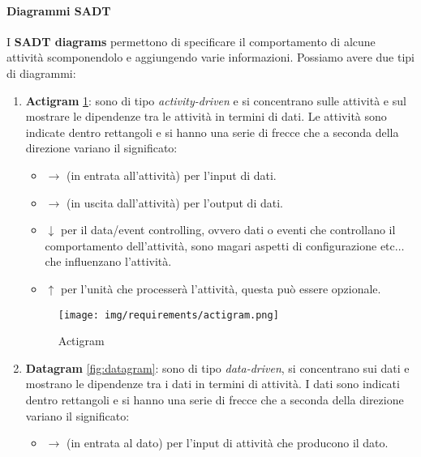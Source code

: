 \paragraph{Diagrammi SADT}
I \textbf{SADT diagrams} permettono di specificare il comportamento di alcune
attività scomponendolo e aggiungendo varie informazioni. Possiamo avere due tipi
di diagrammi:
\begin{enumerate}
      \item \textbf{Actigram} \ref{fig:actigram}: sono di tipo \textit{activity-driven}
            e si concentrano sulle attività e sul mostrare le dipendenze tra le
            attività in termini di dati. Le attività sono indicate dentro
            rettangoli e si hanno una serie di frecce che a seconda della direzione
            variano il significato:
            \begin{itemize}
                  \item $\to$ (in entrata all'attività) per l'input di dati.
                  \item $\to$ (in uscita dall'attività) per l'output di dati.
                  \item $\downarrow$ per il data/event controlling, ovvero dati
                        o eventi che controllano il comportamento dell'attività,
                        sono magari aspetti di configurazione etc$\dots$ che
                        influenzano l'attività.
                  \item $\uparrow$ per l'unità che processerà l'attività, questa
                        può essere opzionale.
            \end{itemize}
            \begin{figure}[!ht]
                  \centering
                  \texttt{[image: img/requirements/actigram.png]}
                  \caption{Actigram}
                  \label{fig:actigram}
            \end{figure}
      \item \textbf{Datagram} \ref{fig:datagram}: sono di tipo \textit{data-driven},
            si concentrano sui dati e mostrano le dipendenze tra i dati in termini
            di attività. I dati sono indicati dentro rettangoli e si hanno una
            serie di frecce che a seconda della direzione variano il significato:
            \begin{itemize}
                  \item $\to$ (in entrata al dato) per l'input di attività che
                        producono il dato.

\end{itemize}
\end{enumerate}

